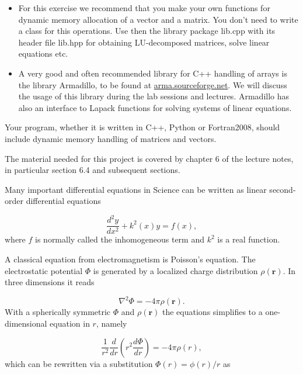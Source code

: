 \documentclass[%
oneside,                 %
final,                   %
10pt]{article}
\begin{document}
\begin{itemize}
  \item For this exercise we recommend that you make your own functions for dynamic memory allocation of a  vector and a matrix. You don't need to write a class for this operations.  Use then the  library package lib.cpp with its header file  lib.hpp for obtaining LU-decomposed matrices, solve linear equations etc.

  \item A very good and often recommended library for C++ handling of arrays is the library Armadillo, to be found at \url{arma.sourceforge.net}.  We will discuss the usage of this library during the lab sessions and lectures. Armadillo has also an interface to Lapack functions for solving systems of linear equations.
\end{itemize}

\noindent
Your program, whether it is written in C++, Python 
or Fortran2008, should include
dynamic memory handling of matrices and vectors. 

The material needed for this project is covered by chapter 6 of the lecture notes, in particular section 6.4 and subsequent sections.



Many important differential equations in  Science can be written as 
linear second-order differential equations

\begin{equation*}
\frac{d^2y}{dx^2}+k^2(x)y = f(x),
\end{equation*}
where $f$ is normally called the inhomogeneous term and $k^2$ is a real function.

A classical equation from electromagnetism is Poisson's equation.
The electrostatic potential $\Phi$ is generated by a localized charge
distribution $\rho (\mathbf{r})$.   In three dimensions 
it reads

\begin{equation*}
\nabla^2 \Phi = -4\pi \rho (\mathbf{r}).
\end{equation*}
With a spherically symmetric $\Phi$ and $\rho (\mathbf{r})$  the equations
simplifies to a one-dimensional equation in $r$, namely

\begin{equation*}
\frac{1}{r^2}\frac{d}{dr}\left(r^2\frac{d\Phi}{dr}\right) = -4\pi \rho(r),
\end{equation*}
which can be rewritten via a substitution $\Phi(r)= \phi(r)/r$ as
\end{document}

